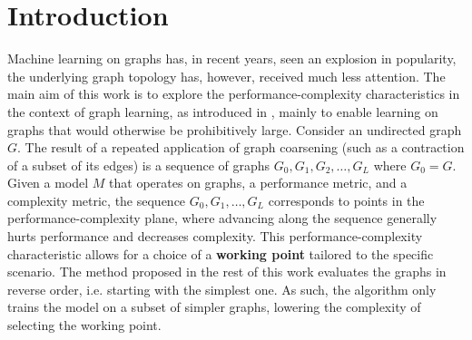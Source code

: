 \section{Introduction}\label{sec:introduction}
Machine learning on graphs has, in recent years, seen an explosion in popularity, the underlying graph topology has, however, received much less attention. The main aim of this work is to explore the performance-complexity characteristics in the context of graph learning, as introduced in \cite{prochazka_downstream_2022}, mainly to enable learning on graphs that would otherwise be prohibitively large. Consider an undirected graph \( G \). The result of a repeated application of graph coarsening (such as a contraction of a subset of its edges) is a sequence of graphs \( G_0, G_1, G_2, \dots, G_L \) where \( G_0 = G \). Given a model \( M \) that operates on graphs, a performance metric, and a complexity metric, the sequence \( G_0, G_1, \dots, G_L \) corresponds to points in the performance-complexity plane, where advancing along the sequence generally hurts performance and decreases complexity. This performance-complexity characteristic allows for a choice of a \textbf{working point} tailored to the specific scenario. The method proposed in the rest of this work evaluates the graphs in reverse order, i.e. starting with the simplest one. As such, the algorithm only trains the model on a subset of simpler graphs, lowering the complexity of selecting the working point.

